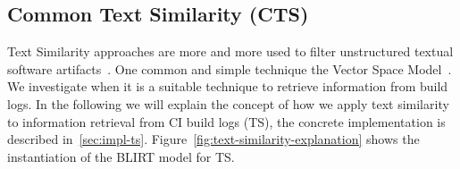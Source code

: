\documentclass[\myrootdir/main.tex]{subfiles}
\begin{document}


\subsection{Common Text Similarity (CTS)}
\label{sec:expl-ts}

Text Similarity approaches are more and more used to filter unstructured textual software artifacts~\cite{runeson2007detection,marcus2005recovery,antoniol2002recovering,mccarey2006recommending}.
One common and simple technique the Vector Space Model~\cite{schutze2008introduction}.
We investigate when it is a suitable technique to retrieve information from build logs.
In the following we will explain the concept of how we apply text similarity to information retrieval from CI build logs (TS), the concrete implementation is described in~\ref{sec:impl-ts}.
Figure~\ref{fig:text-similarity-explanation} shows the instantiation of the BLIRT model for TS.
\end{document}
